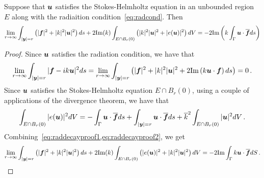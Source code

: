 \begin{lem}
\label{lem:rep}
Suppose that ${\boldsymbol u}$ satisfies the Stokes-Helmholtz equation in 
an unbounded region $E$ along with the radiaition 
condition~\cref{eq:radcond}. 
Then 
\begin{equation}
\label{eq:repinfest}
\lim_{r\to\infty}
\int_{|{\boldsymbol y}|=r} \left( |{\boldsymbol f}|^2 + |k|^2 |{\boldsymbol u}|^2 \right) ds +
2 \text{Im}(k) \int_{E \cap B_{r}(0)} \left(|k|^2 |{\boldsymbol u}|^2 + |e({\boldsymbol u})|^2 \right)
dV = -2 \text{Im} \left( k \int_{\Gamma} {\boldsymbol u} \cdot \overline{{\boldsymbol f}} ds  \right)
\end{equation}
\end{lem}

\begin{proof}
Since ${\boldsymbol u}$ satisfies the radiation condition, we have that
\begin{equation}
\lim_{r\to\infty} \int_{|{\boldsymbol y}|=r} | {\boldsymbol f} - i k {\boldsymbol u}|^2 ds = 
\lim_{r\to\infty} \int_{|{\boldsymbol y}| =r} \left( |{\boldsymbol f}|^2 + |k|^2|{\boldsymbol u}|^2 + 2 \text{Im} 
\left( k {\boldsymbol u}\cdot {\boldsymbol f} \right) ds \label{eq:raddecayproof1}
\right) = 0 \, . 
\end{equation}
Since ${\boldsymbol u}$ satisfies the Stokes-Helmholtz equation $E \cap B_{r}(0)$,
using a couple of applications of the divergence theorem, we have that
\begin{equation}
\int_{E\cap B_{r}(0)} |e({\boldsymbol u})|^2 dV = -\int_{\Gamma} {\boldsymbol u} \cdot \overline{{\boldsymbol f}} ds
+ \int_{|{\boldsymbol y}|=r} {\boldsymbol u} \cdot \overline{{\boldsymbol f}} ds + \overline{k}^2 
\int_{E \cap B_{r}(0)} |{\boldsymbol u}|^2 dV \,. \label{eq:raddecayproof2}
\end{equation}
Combining~\cref{eq:raddecayproof1,eq:raddecayproof2}, we get
\begin{equation}
\lim_{r\to\infty} \int_{|{\boldsymbol y}|=r}\left(|{\boldsymbol f}|^2 + |k|^2 |{\boldsymbol u}|^2 \right) ds 
+ 2\text{Im}(k)\int_{E \cap B_{r}(0)} \left(|e({\boldsymbol u})|^2 + |k|^2 |{\boldsymbol u}|^2 
\right) dV = -2\text{Im} \int_{\Gamma} k {\boldsymbol u} \cdot \overline{{\boldsymbol f}} dS \, .
\end{equation}
\end{proof}

